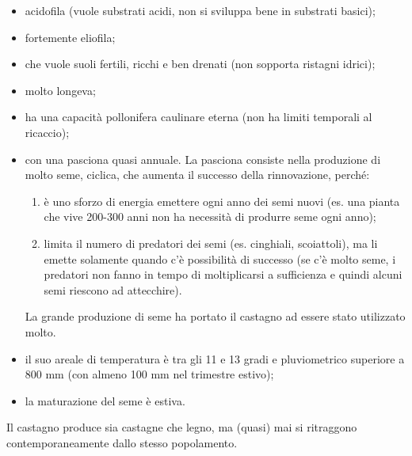 \begin{itemize}[nosep]
    \item acidofila (vuole substrati acidi, non si sviluppa bene in substrati basici);
    \item fortemente eliofila;
    \item che vuole suoli fertili, ricchi e ben drenati (non sopporta ristagni idrici);
    \item molto longeva;
    \item ha una capacità pollonifera caulinare eterna (non ha limiti temporali al ricaccio);
    \item con una pasciona quasi annuale. La pasciona consiste nella produzione di molto seme, ciclica, che aumenta il successo della rinnovazione, perché:
        \begin{enumerate}[nosep]
            \item è uno sforzo di energia emettere ogni anno dei semi nuovi (es. una pianta che vive 200-300 anni non ha necessità di produrre seme ogni anno);
            \item limita il numero di predatori dei semi (es. cinghiali, scoiattoli), ma li emette solamente quando c'è possibilità di successo (se c'è molto seme, i predatori non fanno in tempo di moltiplicarsi a sufficienza e quindi alcuni semi riescono ad attecchire).
        \end{enumerate}
        La grande produzione di seme ha portato il castagno ad essere stato utilizzato molto.
    \item il suo areale di temperatura è tra gli 11 e 13 gradi e pluviometrico superiore a 800 mm (con almeno 100 mm nel trimestre estivo);
    \item la maturazione del seme è estiva.
\end{itemize}
Il castagno produce sia castagne che legno, ma (quasi) mai si ritraggono contemporaneamente dallo stesso popolamento.
